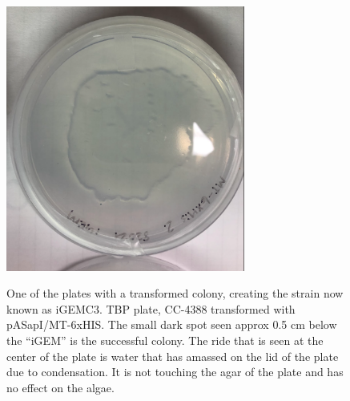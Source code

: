 \begin{figure}[!htbp]
    \centering
    \includegraphics[width=0.7\textwidth]{images/chap3/algae/image4.png}
    \label{fig:ch3algae04}
    \caption{One of the plates with a transformed colony, creating the strain now known as iGEMC3. TBP plate, CC-4388 transformed with pASapI/MT-6xHIS. The small dark spot seen approx 0.5 cm below the “iGEM” is the successful colony. The ride that is seen at the center of the plate is water that has amassed on the lid of the plate due to condensation. It is not touching the agar of the plate and has no effect on the algae.} 
\end{figure}
\FloatBarrier




